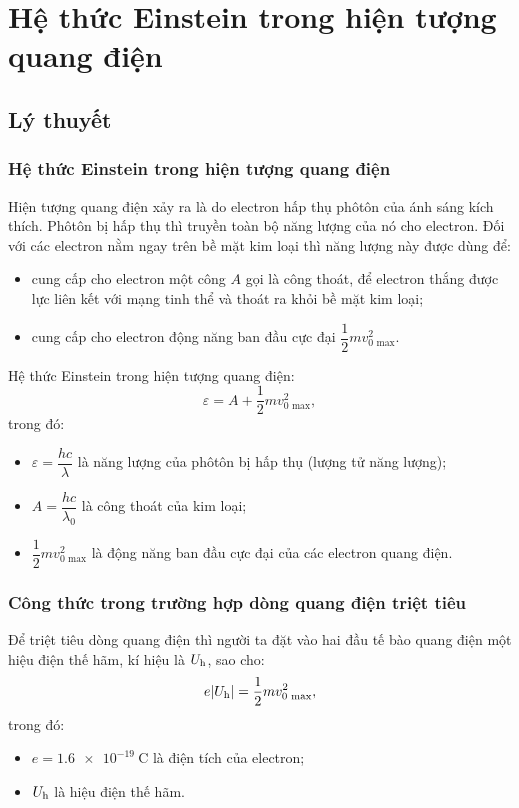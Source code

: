 
\chapter[Hệ thức Einstein trong hiện tượng\\ quang điện]{Hệ thức Einstein trong hiện tượng quang điện}

\section{Lý thuyết}

\subsection{Hệ thức Einstein trong hiện tượng quang điện}

Hiện tượng quang điện xảy ra là do electron hấp thụ phôtôn của ánh sáng kích thích. Phôtôn bị hấp thụ thì truyền toàn bộ năng lượng của nó cho electron. Đối với các electron nằm ngay trên bề mặt kim loại thì năng lượng này được dùng để:
\begin{itemize}
	\item cung cấp cho electron một công $A$ gọi là công thoát, để electron thắng được lực liên kết với mạng tinh thể và thoát ra khỏi bề mặt kim loại;
	\item cung cấp cho electron động năng ban đầu cực đại $\dfrac{1}{2}mv_{\text{0 max}}^2$.
\end{itemize}

Hệ thức Einstein trong hiện tượng quang điện:
\begin{equation}
	\varepsilon = A + \dfrac{1}{2}mv_{\text{0 max}}^2,
\end{equation}
trong đó:
\begin{itemize}
	\item $\varepsilon=\dfrac{hc}{\lambda}$ là năng lượng của phôtôn bị hấp thụ (lượng tử năng lượng);
	\item $A=\dfrac{hc}{\lambda_0}$ là công thoát của kim loại;
	\item $\dfrac{1}{2}mv_\text{0 max}^2$ là động năng ban đầu cực đại của các electron quang điện.
\end{itemize}

\subsection{Công thức trong trường hợp dòng quang điện triệt tiêu}

Để triệt tiêu dòng quang điện thì người ta đặt vào hai đầu tế bào quang điện một hiệu điện thế hãm, kí hiệu là $U_\text h$, sao cho:
\begin{equation}
	e |U_\text h|=	\dfrac{1}{2}mv_\text{0 max}^2 ,
\end{equation}
trong đó:
\begin{itemize}
	\item $e=\SI{1.6e-19}{\coulomb}$ là điện tích của electron;
	\item $U_\text h$ là hiệu điện thế hãm.
\end{itemize}



